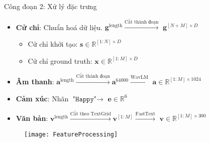 \begin{frame}{Công đoạn 2: Xử lý đặc trưng}

	

\begin{itemize}
	\item \textbf{Cử chỉ}: Chuẩn hoá dữ liệu. $\mathbf{g}^{\operatorname{length}} \xrightarrow{ \text{Cắt thành đoạn} }$ $\mathbf{g}^{[N + M] \times D}$
	\begin{itemize}
		\item Cử chỉ khởi tạo: $\mathbf{s} \in \mathbb{R}^{[1:N] \times D}$
		\item Cử chỉ ground truth: $\mathbf{x} \in \mathbb{R}^{[1:M] \times D}$
	\end{itemize}
		 
	\item \textbf{Âm thanh}:  $\mathbf{a}^{\operatorname{length}} \xrightarrow{ \text{Cắt thành đoạn} } \mathbf{a}^{64000} \xrightarrow{\text{WavLM} } $ $\mathbf{a} \in \mathbb{R}^{[1:M] \times 1024}$
		
	\item \textbf{Cảm xúc}:   Nhãn $\texttt{"Happy"} \rightarrow$ $\mathbf{e} \in \mathbb{R}^{6}$
		
	\item \textbf{Văn bản}:  $\mathbf{v}^{\operatorname{length}} \xrightarrow{ \text{Cắt theo TextGrid} } \mathbf{v}^{[1:M]} \xrightarrow{ \text{FastText} } $ $\mathbf{v} \in \mathbb{R}^{[1:M] \times 300}$
\end{itemize}

	\begin{figure}
	\centering
	\texttt{[image: FeatureProcessing]}
\end{figure}

	
\end{frame}


